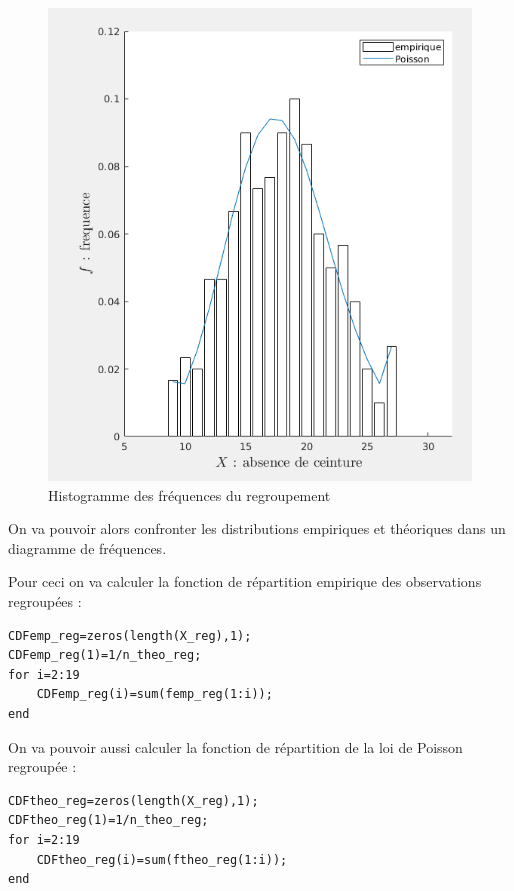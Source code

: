 \documentclass[a4paper,oneside]{article}
\makeatletter
\def\bigcenter{\trivlist \bigcentering\item\relax}
\def\bigcentering{\let\\\@centercr\rightskip\@bigflushglue%
\leftskip\@bigflushglue
\parindent\z@\parfillskip\z@skip}
\makeatother
\begin{document}
\begin{enumerate}
\begin{figure}[h!]
\bigcenter
\includegraphics[scale=0.7]{fig2_sub1.png}
\caption{Histogramme des fréquences du regroupement}
\end{figure}

\pagebreak

On va pouvoir alors confronter les distributions empiriques et théoriques dans un diagramme de fréquences.

Pour ceci on va calculer la fonction de répartition empirique des observations regroupées :

\begin{lstlisting}
CDFemp_reg=zeros(length(X_reg),1);
CDFemp_reg(1)=1/n_theo_reg;
for i=2:19
    CDFemp_reg(i)=sum(femp_reg(1:i));
end
\end{lstlisting}


On va pouvoir aussi calculer la fonction de répartition de la loi de Poisson regroupée :

\begin{lstlisting}
CDFtheo_reg=zeros(length(X_reg),1);
CDFtheo_reg(1)=1/n_theo_reg;
for i=2:19
    CDFtheo_reg(i)=sum(ftheo_reg(1:i));
end
\end{lstlisting}



\end{enumerate}
\end{document}
